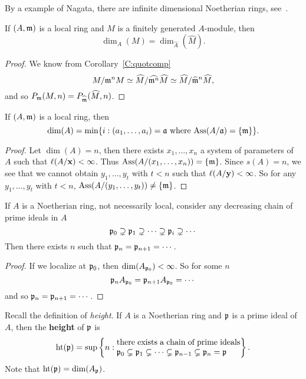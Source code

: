 \documentclass{ximera}
\begin{document}
\begin{remark}
  By a example of Nagata, there are infinite dimensional Noetherian
  rings, see~\cite{mN1962}.
\end{remark}


\begin{corollary}
  If $(A,\mathfrak{m})$ is a local ring and $M$ is a finitely generated
  $A$-module, then
  \[
  \dim_A(M) =\dim_{\hat{A}}(\hat{M}).
  \]
  \begin{proof}
    We know from Corollary~\ref{C:quotcomp}
    \[
    M/\mathfrak{m}^n M \simeq \widehat{M}/\widehat{\mathfrak{m}^n} \widehat{M} \simeq \widehat{M}/ \widehat{\mathfrak{m}}^n\widehat{M},
    \]
    and so $P_{\mathfrak{m}}(M,n) = P_{\widehat{\mathfrak{m}}}(\widehat{M},n)$.
  \end{proof}
\end{corollary}



\begin{corollary}
  If $(A,\mathfrak{m})$ is a local ring, then 
  \[
  \dim(A) = \min\{i: (a_1,\dots,a_i) = \mathfrak{a}\text{ where $\operatorname{Ass}(A/\mathfrak{a}) = \{\mathfrak{m}\}$}\}.
  \]
  \begin{proof}
    Let $\dim(A) = n$, then there exists $x_1,\dots,x_n$ a system of
    parameters of $A$ such that $\ell(A/\mathbf{x}) <\infty$. Thus
    $\operatorname{Ass}(A/(x_1,\dots,x_n)) = \{\mathfrak{m}\}$.  Since $s(A) = n$, we see that
    we cannot obtain $y_1,\dots,y_t$ with $t<n$ such that
    $\ell(A/\mathbf{y})<\infty$.  So for any $y_1,\ldots,y_t$ with $t <
    n$, $\operatorname{Ass}(A/(y_1,\ldots,y_t)) \ne \{\mathfrak{m}\}$.
  \end{proof}
\end{corollary}


\begin{corollary}
  If $A$ is a Noetherian ring, not necessarily local, consider any decreasing chain of prime ideals in $A$ 
  \[
  \mathfrak{p}_0\supsetneq \mathfrak{p}_1\supsetneq \cdots \supsetneq \mathfrak{p}_i\supsetneq \cdots
  \]
  Then there exists $n$ such that $\mathfrak{p}_n = \mathfrak{p}_{n+1} = \cdots$.
  \begin{proof}
    If we localize at $\mathfrak{p}_0$, then $\dim(A_{\mathfrak{p}_0}) <\infty$.  So for some $n$
    \[
    \mathfrak{p}_n A_{\mathfrak{p}_0} = \mathfrak{p}_{n+1} A_{\mathfrak{p}_0} = \cdots
    \]
    and so $\mathfrak{p}_n = \mathfrak{p}_{n+1} = \cdots$.
\end{proof}
\end{corollary}

Recall the definition of \textit{height}. If $A$ is a Noetherian ring
and $\mathfrak{p}$ is a prime ideal of $A$, then the \textbf{height} of $\mathfrak{p}$ is
\[
\h(\p) = \sup\left\{n : \begin{minipage}{15em}there exists a chain of prime ideals $\p_0\subsetneq \p_1 \subsetneq \cdots \subsetneq \p_{n-1}\subsetneq \p_n =\p$\end{minipage} \right\}.
\]
Note that $\operatorname{ht}(\mathfrak{p}) = \dim(A_{\mathfrak{p}})$.
\end{document}
